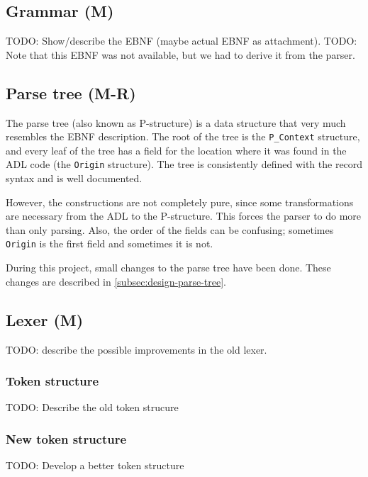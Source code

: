 \subsection{Grammar (M)}
\label{subsec:analysis-grammar}
%
%
TODO: Show/describe the EBNF (maybe actual EBNF as attachment).
TODO: Note that this EBNF was not available, but we had to derive it from the parser.

\subsection{Parse tree (M-R)}
\label{subsec:analysis-parse-tree}
The parse tree (also known as P-structure) is a data structure that very much resembles the EBNF description.
The root of the tree is the \texttt{P\_Context} structure, and every leaf of the tree has a field for the location where it was found in the ADL code (the \texttt{Origin} structure).
The tree is consistently defined with the record syntax and is well documented.

However, the constructions are not completely pure, since some transformations are necessary from the ADL to the P-structure.
This forces the parser to do more than only parsing.
Also, the order of the fields can be confusing; sometimes \texttt{Origin} is the first field and sometimes it is not.

During this project, small changes to the parse tree have been done.
These changes are described in \autoref{subsec:design-parse-tree}.

\subsection{Lexer (M)}
\label{subsec:analysis-lexer}
TODO: describe the possible improvements in the old lexer.

\subsubsection{Token structure}
TODO: Describe the old token strucure

\subsubsection{New token structure}
TODO: Develop a better token structure

